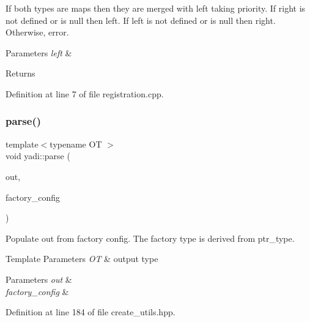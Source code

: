 If both types are maps then they are merged with left taking priority. If right is not defined or is null then left. If left is not defined or is null then right. Otherwise, error. 
\begin{DoxyParams}{Parameters}
{\em left} & \\
\hline
\end{DoxyParams}
\begin{DoxyReturn}{Returns}

\end{DoxyReturn}


Definition at line 7 of file registration.\+cpp.

\mbox{\label{namespaceyadi_ace9d761848d60ab00f257fdd9f5f2f21}} 
\subsubsection{\texorpdfstring{parse()}{parse()}}
{\footnotesize\ttfamily template$<$typename OT $>$ \\
void yadi\+::parse (\begin{DoxyParamCaption}\item[{OT \&}]{out,  }\item[{Y\+A\+M\+L\+::\+Node const \&}]{factory\+\_\+config }\end{DoxyParamCaption})}



Populate out from factory config. The factory type is derived from ptr\+\_\+type. 


\begin{DoxyTemplParams}{Template Parameters}
{\em OT} & output type \\
\hline
\end{DoxyTemplParams}

\begin{DoxyParams}{Parameters}
{\em out} & \\
\hline
{\em factory\+\_\+config} & \\
\hline
\end{DoxyParams}


Definition at line 184 of file create\+\_\+utils.\+hpp.

\mbox{\label{namespaceyadi_a5f8e048a8bef5792a7c5b3aae435999d}} 
